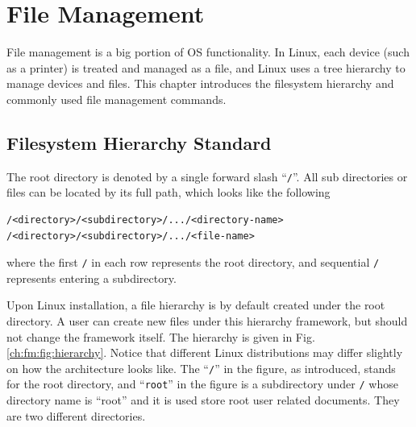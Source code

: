 \chapter{File Management} \label{ch:fm}

File management is a big portion of OS functionality. In Linux, each device (such as a printer) is treated and managed as a file, and Linux uses a tree hierarchy to manage devices and files. This chapter introduces the filesystem hierarchy and commonly used file management commands.

\section{Filesystem Hierarchy Standard} \label{ch:fm:sec:hierarchy}

The root directory is denoted by a single forward slash ``\verb|/|''. All sub directories or files can be located by its full path, which looks like the following
\begin{lstlisting}
/<directory>/<subdirectory>/.../<directory-name>
/<directory>/<subdirectory>/.../<file-name>
\end{lstlisting}
where the first \verb|/| in each row represents the root directory, and sequential \verb|/| represents entering a subdirectory.

Upon Linux installation, a file hierarchy is by default created under the root directory. A user can create new files under this hierarchy framework, but should not change the framework itself. The hierarchy is given in Fig. \ref{ch:fm:fig:hierarchy}. Notice that different Linux distributions may differ slightly on how the architecture looks like. The ``\verb|/|'' in the figure, as introduced, stands for the root directory, and ``\verb|root|'' in the figure is a subdirectory under \verb|/| whose directory name is ``root'' and it is used store root user related documents. They are two different directories.

